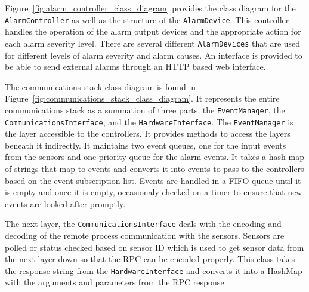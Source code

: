 \documentclass{report}
\begin{document}
Figure~\ref{fig:alarm_controller_class_diagram} provides the class diagram for
the \texttt{AlarmController} as well as the structure of the
\texttt{AlarmDevice}. This controller handles the operation of the alarm output
devices and the appropriate action for each alarm severity level. There are
several different \texttt{AlarmDevices} that are used for different levels of
alarm severity and alarm causes. An interface is provided to be able to send
external alarms through an HTTP based web interface.

The communications stack class diagram is found in
Figure~\ref{fig:communications_stack_class_diagram}. It represents the entire
communications stack as a summation of three parts, the \texttt{EventManager},
the \texttt{CommunicationsInterface}, and the \texttt{HardwareInterface}. The
\texttt{EventManager} is the layer accessible to the controllers. It provides
methods to access the layers beneath it indirectly. It maintains two event
queues, one for the input events from the sensors and one priority queue for
the alarm events. It takes a hash map of strings that map to events and
converts it into events to pass to the controllers based on the event
subscription list. Events are handled in a FIFO queue until it is empty and
once it is empty, occasionaly checked on a timer to ensure that new events are
looked after promptly.

The next layer, the \texttt{CommunicationsInterface} deals with the encoding
and decoding of the remote process communication with the sensors. Sensors are
polled or status checked based on sensor ID which is used to get sensor data
from the next layer down so that the RPC can be encoded properly. This class
takes the response string from the \texttt{HardwareInterface} and converts it
into a HashMap with the arguments and parameters from the RPC response.
\end{document}
